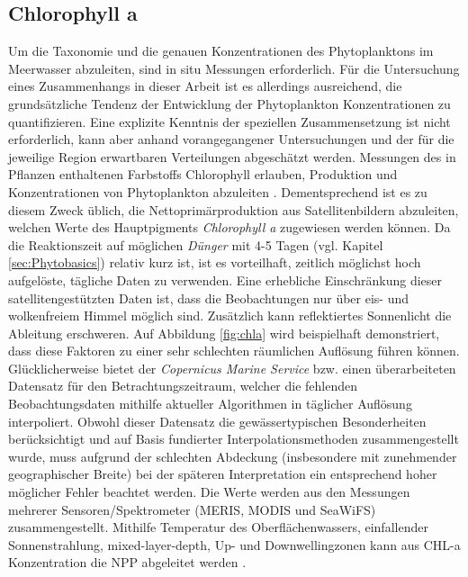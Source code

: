 \documentclass[12pt,a4paper,onecolumn]{scrartcl}
\begin{document}
\subsection{Chlorophyll a} \label{sec:chla}
Um die Taxonomie und die genauen Konzentrationen des Phytoplanktons im Meerwasser abzuleiten, sind in situ Messungen erforderlich. Für die Untersuchung eines Zusammenhangs in dieser Arbeit ist es allerdings ausreichend, die grundsätzliche Tendenz der Entwicklung der Phytoplankton Konzentrationen zu quantifizieren. Eine explizite Kenntnis der speziellen Zusammensetzung ist nicht erforderlich, kann aber anhand vorangegangener Untersuchungen und der für die jeweilige Region erwartbaren Verteilungen abgeschätzt werden. Messungen des in Pflanzen enthaltenen Farbstoffs Chlorophyll erlauben, Produktion und Konzentrationen von Phytoplankton abzuleiten \citep{RYTHER.1957}. Dementsprechend ist es zu diesem Zweck üblich, die Nettoprimärproduktion aus Satellitenbildern abzuleiten, welchen Werte des Hauptpigments \textit{Chlorophyll a} zugewiesen werden können. Da die Reaktionszeit auf möglichen \textit{Dünger} mit 4-5 Tagen (vgl. Kapitel \ref{sec:Phytobasics}) relativ kurz ist, ist es vorteilhaft, zeitlich möglichst hoch aufgelöste, tägliche Daten zu verwenden. Eine erhebliche Einschränkung dieser satellitengestützten Daten ist, dass die Beobachtungen nur über eis- und wolkenfreiem Himmel möglich sind. Zusätzlich kann reflektiertes Sonnenlicht die Ableitung erschweren. Auf Abbildung \ref{fig:chla} wird beispielhaft demonstriert, dass diese Faktoren zu einer sehr schlechten räumlichen Auflösung führen können. Glücklicherweise bietet der \textit{Copernicus Marine Service} bzw. \citet{Saulquin.2019} einen überarbeiteten Datensatz für den Betrachtungszeitraum, welcher die fehlenden Beobachtungsdaten mithilfe aktueller Algorithmen in täglicher Auflösung interpoliert. Obwohl dieser Datensatz die gewässertypischen Besonderheiten berücksichtigt und auf Basis fundierter Interpolationsmethoden zusammengestellt wurde, muss aufgrund der schlechten Abdeckung (insbesondere mit zunehmender geographischer Breite) bei der späteren Interpretation ein entsprechend hoher möglicher Fehler beachtet werden. Die Werte werden  aus den Messungen mehrerer Sensoren/Spektrometer (MERIS, MODIS und SeaWiFS) zusammengestellt. Mithilfe Temperatur des Oberflächenwassers, einfallender Sonnenstrahlung, mixed-layer-depth, Up- und Downwellingzonen kann aus CHL-a Konzentration die NPP abgeleitet werden \citep{Falkowski.1998}.
\end{document}
